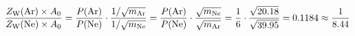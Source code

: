 \begin{eqnarray*}
\frac{Z_\mathrm{W} (\ce{Ar}) \times A_0}{Z_\mathrm{W} (\ce{Ne}) \times A_0}
=
\frac{P(\ce{Ar})}{P(\ce{Ne})}
\cdot
\frac
{1/\sqrt{m_{\ce{Ar}}}}
{1/\sqrt{m_{\ce{Ne}}}}
=
\frac{P(\ce{Ar})}{P(\ce{Ne})}
\cdot
\frac
{\sqrt{m_{\ce{Ne}}}}
{\sqrt{m_{\ce{Ar}}}}
=
\frac{1}{6}
\cdot
\frac{\sqrt{20.18}}{\sqrt{39.95}}
=
0.1184
\approx
\frac{
1
}{
8.44
}
\label{}
\end{eqnarray*}
